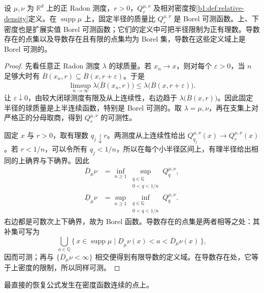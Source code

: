 \begin{proposition}
\label{b1:prop:relative-density-borel}
设 \(\mu,\nu\) 为 \(\mathbb R^d\) 上的正 Radon 测度，\(r>0\)，\(Q_r^{\mu,\nu}\) 及相对密度按\cref{b1:def:relative-density}定义。在 \(\operatorname{supp}\mu\) 上，固定半径的质量比 \(Q_r^{\mu,\nu}\) 是 Borel 可测函数。上、下密度也是扩展实值 Borel 可测函数；它们的定义中可把半径限制为正有理数。导数存在的点集以及导数存在且有限的点集均为 Borel 集，导数在这些定义域上是 Borel 可测的。
\end{proposition}
\begin{proof}
先看任意正 Radon 测度 \(\lambda\) 的球质量。若 \(x_n\to x\)，则对每个 \(\varepsilon>0\)，当 \(n\) 足够大时有
\(\overline B(x_n,r)\subseteq\overline B(x,r+\varepsilon)\)。于是
\[
\limsup_{n\to\infty}\lambda\bigl(\overline B(x_n,r)\bigr)
\leq\lambda\bigl(\overline B(x,r+\varepsilon)\bigr).
\]
让 \(\varepsilon\downarrow0\)，由较大闭球测度有限及从上连续性，右边趋于 \(\lambda\bigl(\overline B(x,r)\bigr)\)。因此固定半径的球质量是上半连续函数，特别是 Borel 可测的。取 \(\lambda=\mu,\nu\)，再在支集上对严格正的分母取商，得到 \(Q_r^{\mu,\nu}\) 的可测性。

固定 \(x\) 与 \(r>0\)，取有理数 \(q_j\downarrow r\)。两测度从上连续性给出
\(Q_{q_j}^{\mu,\nu}(x)\to Q_r^{\mu,\nu}(x)\)。若 \(r<1/n\)，可以令所有 \(q_j<1/n\)，所以在每个小半径区间上，有理半径给出相同的上确界与下确界。因此
\[
\begin{aligned}
\overline D_\mu\nu
&=\inf_{n\geq1}\sup_{\substack{q\in\mathbb Q\\0<q<1/n}}Q_q^{\mu,\nu},\\
\underline D_\mu\nu
&=\sup_{n\geq1}\inf_{\substack{q\in\mathbb Q\\0<q<1/n}}Q_q^{\mu,\nu}.
\end{aligned}
\]
右边都是可数次上下确界，故为 Borel 函数。导数存在的点集是两者相等之处：其补集可写为
\[
\bigcup_{a\in\mathbb Q}
\{\,x\in\operatorname{supp}\mu\mid
\underline D_\mu\nu(x)<a<\overline D_\mu\nu(x)\,\},
\]
因而可测；再与 \(\{\overline D_\mu\nu<\infty\}\) 相交便得到有限导数的定义域。在导数存在处，它等于上密度的限制，所以同样可测。
\end{proof}

最直接的恢复公式发生在密度函数连续的点上。

